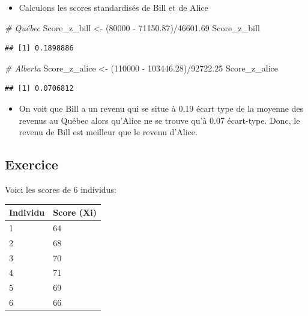 \documentclass[
]{article}
\newenvironment{Shaded}{\begin{snugshade}}{\end{snugshade}}
\newcommand{\CommentTok}[1]{\textcolor[rgb]{0.56,0.35,0.01}{\textit{#1}}}
\newcommand{\DecValTok}[1]{\textcolor[rgb]{0.00,0.00,0.81}{#1}}
\newcommand{\FloatTok}[1]{\textcolor[rgb]{0.00,0.00,0.81}{#1}}
\newcommand{\NormalTok}[1]{#1}
\newcommand{\OtherTok}[1]{\textcolor[rgb]{0.56,0.35,0.01}{#1}}
\newcommand{\SpecialCharTok}[1]{\textcolor[rgb]{0.00,0.00,0.00}{#1}}
\providecommand{\tightlist}{%
  \setlength{\itemsep}{0pt}\setlength{\parskip}{0pt}}
\begin{document}
\begin{itemize}
\tightlist
\item
  Calculons les scores standardisés de Bill et de Alice
\end{itemize}

\begin{Shaded}
\begin{Highlighting}[]
\CommentTok{\# Québec}
\NormalTok{Score\_z\_bill }\OtherTok{\textless{}{-}}\NormalTok{ (}\DecValTok{80000} \SpecialCharTok{{-}} \FloatTok{71150.87}\NormalTok{)}\SpecialCharTok{/}\FloatTok{46601.69}
\NormalTok{Score\_z\_bill}
\end{Highlighting}
\end{Shaded}

\begin{verbatim}
## [1] 0.1898886
\end{verbatim}

\begin{Shaded}
\begin{Highlighting}[]
\CommentTok{\# Alberta}
\NormalTok{Score\_z\_alice }\OtherTok{\textless{}{-}}\NormalTok{ (}\DecValTok{110000} \SpecialCharTok{{-}} \FloatTok{103446.28}\NormalTok{)}\SpecialCharTok{/}\FloatTok{92722.25}
\NormalTok{Score\_z\_alice}
\end{Highlighting}
\end{Shaded}

\begin{verbatim}
## [1] 0.0706812
\end{verbatim}

\begin{itemize}
\tightlist
\item
  On voit que Bill a un revenu qui se situe à 0.19 écart type de la
  moyenne des revenus au Québec alors qu'Alice ne se trouve qu'à 0.07
  écart-type. Donc, le revenu de Bill est meilleur que le revenu
  d'Alice.
\end{itemize}

\hypertarget{exercice}{%
\subsection{Exercice}\label{exercice}}

Voici les scores de 6 individus:

\begin{longtable}[]{@{}ll@{}}
\toprule()
Individu & Score (Xi) \\
\midrule()
\endhead
1 & 64 \\
2 & 68 \\
3 & 70 \\
4 & 71 \\
5 & 69 \\
6 & 66 \\
\bottomrule()
\end{longtable}
\end{document}
